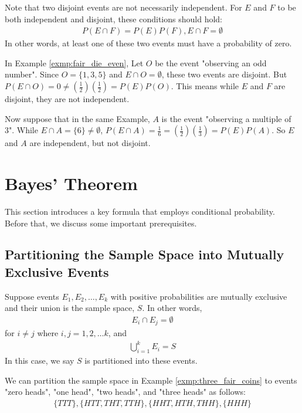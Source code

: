 Note that two disjoint events are not necessarily independent.
For \( E \) and \( F \) to be both independent and disjoint, these conditions should hold:
\begin{gather*}
	P(E \cap F) = P(E)P(F), E \cap F = \emptyset
\end{gather*}
In other words, at least one of these two events must have a probability of zero.
\begin{exmp}
	In Example \autoref{exmp:fair_die_even},
	Let \( O \) be the event "observing an odd number".
	Since \( O = \{ 1, 3, 5 \} \) and \( E \cap O = \emptyset \), these two events are disjoint.
	But \( P(E \cap O) = 0 \neq (\frac{1}{2})(\frac{1}{2}) = P(E)P(O) \).
	This means while \( E \) and \( F \) are disjoint, they are not independent.

	Now suppose that in the same Example, \( A \) is the event "observing a multiple of 3".
	While \( E \cap A = \{ 6 \} \neq \emptyset \), \( P(E \cap A) = \frac{1}{6} = (\frac{1}{2})(\frac{1}{3}) = P(E)P(A) \).
	So \( E \) and \( A \) are independent, but not disjoint.
\end{exmp}

\section{Bayes' Theorem}

This section introduces a key formula that employs conditional probability.
Before that, we discuss some important prerequisites.

\subsection{Partitioning the Sample Space into Mutually Exclusive Events}

Suppose events \( E_1, E_2, \ldots, E_k \) with positive probabilities are mutually exclusive and their union is the sample space, \( S \).
In other words,
\begin{gather*}
	E_i \cap E_j = \emptyset
\end{gather*}
for \( i \neq j \) where \( i, j = 1, 2, \ldots k \), and
\begin{gather*}
	\bigcup_{i = 1}^{k} E_i = S
\end{gather*}
In this case, we say \( S \) is partitioned into these events.

\begin{exmp}
	We can partition the sample space in Example \autoref{exmp:three_fair_coins} to events "zero heads", "one head", "two heads", and "three heads" as follows:
	\begin{gather*}
		\{ TTT \}, \{ HTT, THT, TTH \}, \{ HHT, HTH, THH \}, \{ HHH \}
	\end{gather*}
\end{exmp}

